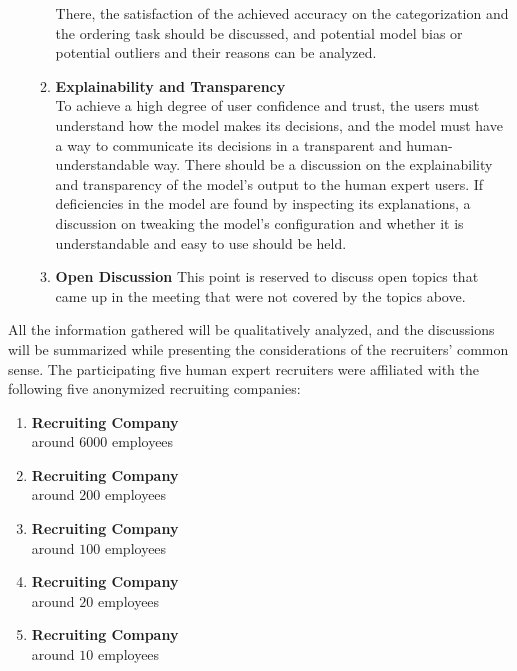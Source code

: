 \documentclass[draft,final]{thesisclass} %
\begin{document}
\begin{enumerate}
\begin{enumerate}
        There, the satisfaction of the achieved accuracy on the categorization and the ordering task should be discussed, and potential model bias or potential outliers and their reasons can be analyzed.
        \item \textbf{Explainability and Transparency}\\
        To achieve a high degree of user confidence and trust, the users must understand how the model makes its decisions, and the model must have a way to communicate its decisions in a transparent and human-understandable way.
        There should be a discussion on the explainability and transparency of the model's output to the human expert users.
        If deficiencies in the model are found by inspecting its explanations, a discussion on tweaking the model's configuration and whether it is understandable and easy to use should be held.
        \item \textbf{Open Discussion}
        This point is reserved to discuss open topics that came up in the meeting that were not covered by the topics above.
    \end{enumerate}
\end{enumerate}
All the information gathered will be qualitatively analyzed, and the discussions will be summarized while presenting the considerations of the recruiters' common sense.
The participating five human expert recruiters were affiliated with the following five anonymized recruiting companies:
\begin{enumerate}
    \item \textbf{Recruiting Company}\\
    around $6000$ employees
    \item \textbf{Recruiting Company}\\
    around $200$ employees
    \item \textbf{Recruiting Company}\\
    around $100$ employees
    \item \textbf{Recruiting Company}\\
    around $20$ employees
    \item \textbf{Recruiting Company}\\
    around $10$ employees
\end{enumerate}
\end{document}
